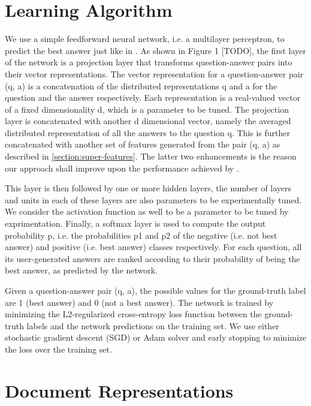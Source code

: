 \documentclass[12pt, a4paper, oneside]{Thesis} %
\begin{document}
\section{Learning Algorithm}
\label{section:learning-algo}

We use a simple feedforward neural network, i.e. a multilayer perceptron, to predict the best answer just like in \cite{bogdanova2016we}. As shown in Figure 1 [TODO], the first layer of the network is a projection layer that transforms question-answer pairs into their vector representations. The vector representation for a question-answer pair (q, a) is a concatenation of the distributed representations q and a for the question and the answer respectively. Each representation is a real-valued vector of a fixed dimensionality d, which is a parameter to be tuned. The projection layer is concatenated with another d dimensional vector, namely the averaged distributed representation of all the answers to the question q. This is further concatenated with another set of features generated from the pair (q, a) as described in \autoref{section:super-features}. The latter two enhancements is the reason our approach shall improve upon the performance achieved by \cite{bogdanova2016we}.

This layer is then followed by one or more hidden layers, the number of layers and units in each of these layers are also parameters to be experimentally tuned. We consider the activation function as well to be a parameter to be tuned by exprimentation. Finally, a softmax layer is used to compute the output probability p, i.e. the probabilities p1 and p2 of the negative (i.e. not best answer) and positive (i.e. best answer) classes respectively. For each question, all its user-generated answers are ranked according to their probability of being the best answer, as predicted by the network.

Given a question-answer pair (q, a), the possible values for the ground-truth label are 1 (best answer) and 0 (not a best answer). The network is trained by minimizing the L2-regularized cross-entropy loss function between the ground-truth labels and the network predictions on the training set. We use either stochastic gradient descent (SGD) or Adam solver and early stopping to minimize the loss over the training set.

\section{Document Representations}
\end{document}
